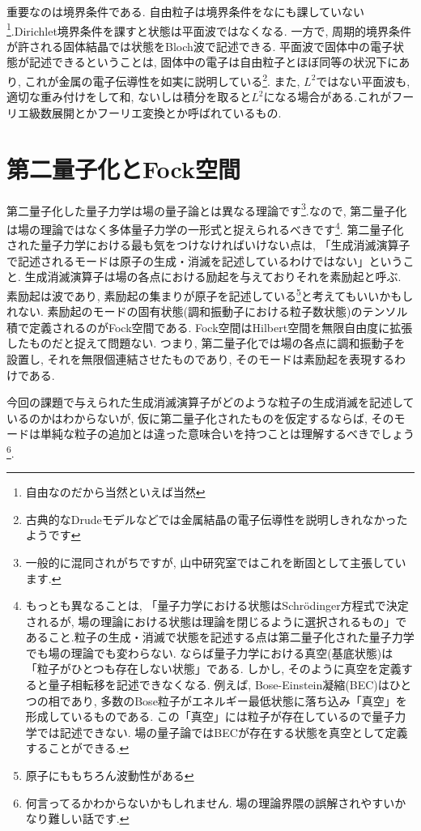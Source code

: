 \documentclass[10.5pt,a4paper]{jreport}
\begin{document}
重要なのは境界条件である. 自由粒子は境界条件をなにも課していない\footnote{自由なのだから当然といえば当然}.Dirichlet境界条件を課すと状態は平面波ではなくなる. 一方で, 周期的境界条件が許される固体結晶では状態をBloch波で記述できる. 平面波で固体中の電子状態が記述できるということは, 固体中の電子は自由粒子とほぼ同等の状況下にあり, これが金属の電子伝導性を如実に説明している\footnote{古典的なDrudeモデルなどでは金属結晶の電子伝導性を説明しきれなかったようです}. また, $L^2$ではない平面波も, 適切な重み付けをして和, ないしは積分を取ると$L^2$になる場合がある.これがフーリエ級数展開とかフーリエ変換とか呼ばれているもの.

\section{第二量子化とFock空間}
第二量子化した量子力学は場の量子論とは異なる理論です\footnote{一般的に混同されがちですが, 山中研究室ではこれを断固として主張しています.}.なので, 第二量子化は場の理論ではなく多体量子力学の一形式と捉えられるべきです\footnote{もっとも異なることは, 「量子力学における状態はSchr\"odinger方程式で決定されるが, 場の理論における状態は理論を閉じるように選択されるもの」であること.粒子の生成・消滅で状態を記述する点は第二量子化された量子力学でも場の理論でも変わらない. ならば量子力学における真空(基底状態)は「粒子がひとつも存在しない状態」である. しかし, そのように真空を定義すると量子相転移を記述できなくなる. 例えば, Bose-Einstein凝縮(BEC)はひとつの相であり, 多数のBose粒子がエネルギー最低状態に落ち込み「真空」を形成しているものである. この「真空」には粒子が存在しているので量子力学では記述できない. 場の量子論ではBECが存在する状態を真空として定義することができる.}. 第二量子化された量子力学における最も気をつけなければいけない点は, 「生成消滅演算子で記述されるモードは原子の生成・消滅を記述しているわけではない」ということ. 生成消滅演算子は場の各点における励起を与えておりそれを素励起と呼ぶ. 素励起は波であり, 素励起の集まりが原子を記述している\footnote{原子にももちろん波動性がある}と考えてもいいかもしれない. 素励起のモードの固有状態(調和振動子における粒子数状態)のテンソル積で定義されるのがFock空間である. Fock空間はHilbert空間を無限自由度に拡張したものだと捉えて問題ない. つまり, 第二量子化では場の各点に調和振動子を設置し, それを無限個連結させたものであり, そのモードは素励起を表現するわけである.

今回の課題で与えられた生成消滅演算子がどのような粒子の生成消滅を記述しているのかはわからないが, 仮に第二量子化されたものを仮定するならば, そのモードは単純な粒子の追加とは違った意味合いを持つことは理解するべきでしょう\footnote{何言ってるかわからないかもしれません. 場の理論界隈の誤解されやすいかなり難しい話です.}.
\end{document}
